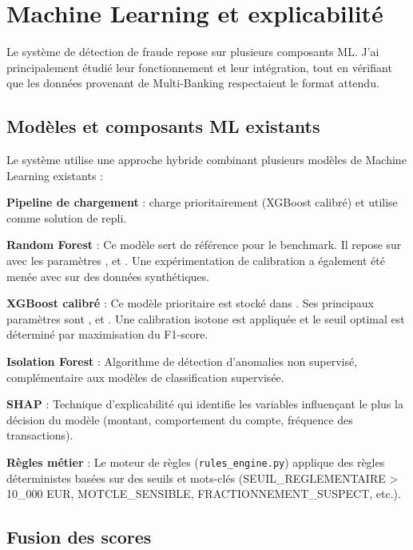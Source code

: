 \documentclass[12pt,a4paper]{extreport}
\begin{document}
\section{Machine Learning et explicabilité}

Le système de détection de fraude repose sur plusieurs composants ML. J’ai principalement étudié leur fonctionnement et leur intégration, tout en vérifiant que les données provenant de Multi-Banking respectaient le format attendu.


\subsection{Modèles et composants ML existants}

Le système utilise une approche hybride combinant plusieurs modèles de Machine Learning existants :

\noindent\textbf{Pipeline de chargement} :  charge prioritairement  (XGBoost calibré) et utilise  comme solution de repli.

\noindent\textbf{Random Forest} : Ce modèle sert de référence pour le benchmark. Il repose sur  avec les paramètres ,  et . Une expérimentation de calibration a également été menée avec  sur des données synthétiques.

\noindent\textbf{XGBoost calibré} : Ce modèle prioritaire est stocké dans . Ses principaux paramètres sont ,  et . Une calibration isotone est appliquée et le seuil optimal est déterminé par maximisation du F1-score.

\noindent\textbf{Isolation Forest} : Algorithme de détection d'anomalies non supervisé, complémentaire aux modèles de classification supervisée.

\noindent\textbf{SHAP} : Technique d'explicabilité qui identifie les variables influençant le plus la décision du modèle (montant, comportement du compte, fréquence des transactions).

\noindent\textbf{Règles métier} : Le moteur de règles (\texttt{rules\_engine.py}) applique des règles déterministes basées sur des seuils et mots-clés (SEUIL\_REGLEMENTAIRE > 10\_000 EUR, MOTCLE\_SENSIBLE, FRACTIONNEMENT\_SUSPECT, etc.).

\subsection{Fusion des scores}
\end{document}
